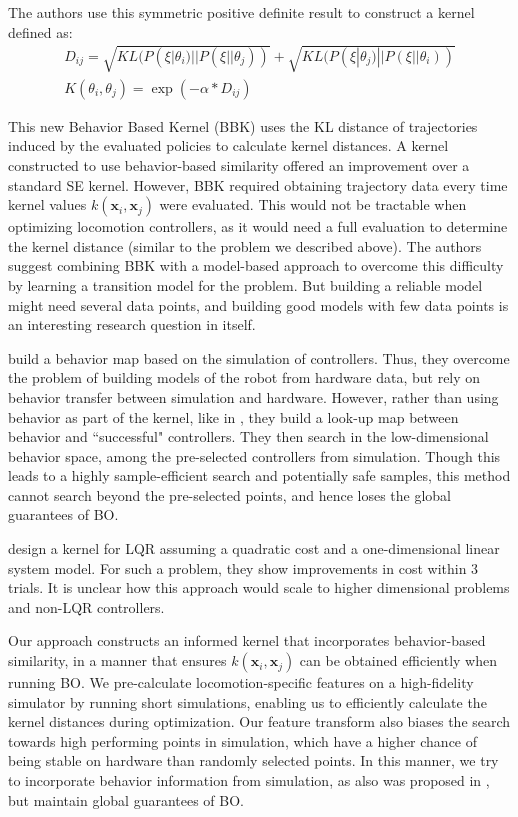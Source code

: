 The authors use this symmetric positive definite result to construct a kernel defined as:
\begin{align}
D_{ij} = \sqrt{KL(P(\xi|\theta_i)||P(\xi || \theta_j))} + \sqrt{ KL(P(\xi|\theta_j)||P(\xi || \theta_i))} \\
K(\theta_i, \theta_j) = \exp(-\alpha * D_{ij})
\end{align}

This new Behavior Based Kernel (BBK) uses the KL distance of trajectories induced by the evaluated policies to calculate kernel distances. A kernel constructed to use behavior-based similarity offered an improvement over a standard SE kernel. However, BBK required obtaining trajectory data every time kernel values $k(\pmb{x}_i, \pmb{x}_j)$ were evaluated. This would not be tractable when optimizing locomotion controllers, as it would need a full evaluation to determine the kernel distance (similar to the problem we described above). The authors suggest combining BBK with a model-based approach to overcome this difficulty by learning a transition model for the problem. But building a reliable model might need several data points, and building good models with few data points is an interesting research question in itself.

\cite{cully2015robots} build a behavior map based on the simulation of controllers. Thus, they overcome the problem of building models of the robot from hardware data, but rely on behavior transfer between simulation and hardware. However, rather than using behavior as part of the kernel, like in \cite{wilson2014using}, they build a look-up map between behavior and ``successful" controllers. They then search in the low-dimensional behavior space, among the pre-selected controllers from simulation. Though this leads to a highly sample-efficient search and potentially safe samples, this method cannot search beyond the pre-selected points, and hence loses the global guarantees of BO.

\cite{marco2017design} design a kernel for LQR assuming a quadratic cost and a one-dimensional linear system model. For such a problem, they show improvements in cost within 3 trials. It is unclear how this approach would scale to higher dimensional problems and non-LQR controllers.

Our approach constructs an informed kernel that incorporates behavior-based similarity, in a manner that ensures $k(\pmb{x}_i, \pmb{x}_j)$ can be obtained efficiently when running BO. We pre-calculate locomotion-specific features on a high-fidelity simulator by running short simulations, enabling us to efficiently calculate the kernel distances during optimization. Our feature transform also biases the search towards high performing points in simulation, which have a higher chance of being stable on hardware than randomly selected points. In this manner, we try to incorporate behavior information from simulation, as also was proposed in \cite{cully2015robots}, but maintain global guarantees of BO.



